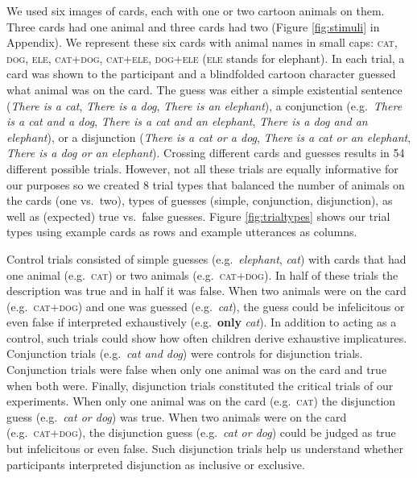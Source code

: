 \documentclass[
  english,
  ,man,floatsintext]{apa6}
\begin{document}
We used six images of cards, each with one or two cartoon animals on them. Three cards had one animal and three cards had two (Figure \ref{fig:stimuli} in Appendix). We represent these six cards with animal names in small caps: \textsc{cat, dog, ele, cat+dog, cat+ele, dog+ele} (\textsc{ele} stands for elephant). In each trial, a card was shown to the participant and a blindfolded cartoon character guessed what animal was on the card. The guess was either a simple existential sentence (\emph{There is a cat}, \emph{There is a dog}, \emph{There is an elephant}), a conjunction (e.g.~\emph{There is a cat and a dog}, \emph{There is a cat and an elephant}, \emph{There is a dog and an elephant}), or a disjunction (\emph{There is a cat or a dog}, \emph{There is a cat or an elephant}, \emph{There is a dog or an elephant}). Crossing different cards and guesses results in 54 different possible trials. However, not all these trials are equally informative for our purposes so we created 8 trial types that balanced the number of animals on the cards (one vs.~two), types of guesses (simple, conjunction, disjunction), as well as (expected) true vs.~false guesses. Figure \ref{fig:trialtypes} shows our trial types using example cards as rows and example utterances as columns.

Control trials consisted of simple guesses (e.g.~\emph{elephant}, \emph{cat}) with cards that had one animal (e.g.~\textsc{cat}) or two animals (e.g.~\textsc{cat+dog}). In half of these trials the description was true and in half it was false. When two animals were on the card (e.g.~\textsc{cat+dog}) and one was guessed (e.g.~\emph{cat}), the guess could be infelicitous or even false if interpreted exhaustively (e.g.~\textbf{only} \emph{cat}). In addition to acting as a control, such trials could show how often children derive exhaustive implicatures. Conjunction trials (e.g.~\emph{cat and dog}) were controls for disjunction trials. Conjunction trials were false when only one animal was on the card and true when both were. Finally, disjunction trials constituted the critical trials of our experiments. When only one animal was on the card (e.g.~\textsc{cat}) the disjunction guess (e.g.~\emph{cat or dog}) was true. When two animals were on the card (e.g.~\textsc{cat+dog}), the disjunction guess (e.g.~\emph{cat or dog}) could be judged as true but infelicitous or even false. Such disjunction trials help us understand whether participants interpreted disjunction as inclusive or exclusive.
\end{document}
